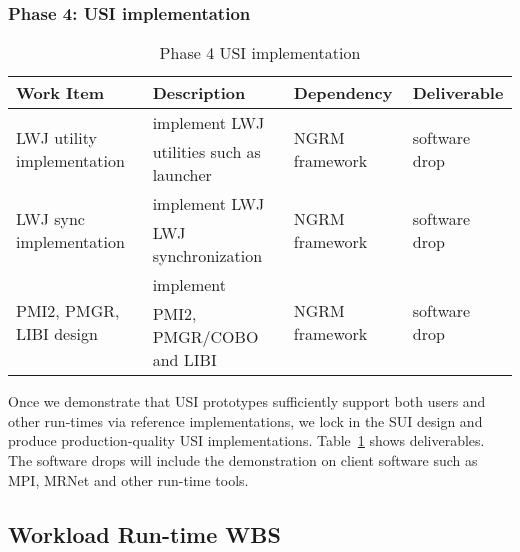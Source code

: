 \subsubsection{Phase 4: USI implementation}
\begin{table}
\centering
\begin{tabular}{|l|l|l|l|}
\hline
Work Item & Description & Dependency & Deliverable \\
\hline
\multirow{2}{*}{LWJ utility implementation} & implement LWJ& \multirow{2}{*}{NGRM framework} & \multirow{2}{*}{software drop} \\
& utilities such as launcher & & \\ \hline
\multirow{2}{*}{LWJ sync implementation} & implement LWJ& \multirow{2}{*}{NGRM framework} & \multirow{2}{*}{software drop} \\
& LWJ synchronization & & \\ \hline
\multirow{2}{*}{PMI2, PMGR, LIBI design} & implement & \multirow{2}{*}{NGRM framework} & \multirow{2}{*}{software drop} \\
& PMI2, PMGR/COBO and LIBI & & \\ \hline
\end{tabular}
\caption{Phase 4 USI implementation}
\label{tab:phase4}
\end{table}

Once we demonstrate that USI prototypes sufficiently support both users and
other run-times via reference implementations, we lock in the SUI design and
produce production-quality USI implementations. Table~\ref{tab:phase4} shows
deliverables. The software drops will include the demonstration on client
software such as MPI, MRNet and other run-time tools.

\ifwbs
\newpage
\subsection{Workload Run-time WBS}

